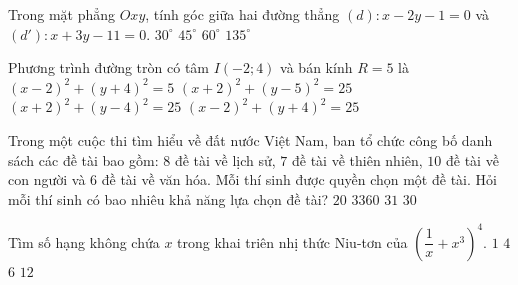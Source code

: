 \begin{ex}%
	Trong mặt phẳng $Oxy$, tính góc giữa hai đường thẳng $(d)\colon  x - 2y -1 = 0$ và  $(d')\colon x + 3y -11 = 0$. 
	\choice
	{$30^\circ$}
	{\True $45^\circ$}
	{$60^\circ$}
	{$135^\circ$}
\end{ex}

\begin{ex}%
	Phương trình đường tròn có tâm $I(-2; 4)$ và bán kính $R = 5$ là
	\choice
	{$(x-2)^2+(y+4)^2=5$}
	{$(x+2)^2+(y-5)^2=25$}
	{\True $(x+2)^2+(y-4)^2=25$}
	{$(x-2)^2+(y+4)^2=25$}
\end{ex}

\begin{ex}%
	Trong một cuộc thi tìm hiểu về đất nước Việt Nam, ban tổ chức công bố danh sách các đề tài bao gồm: $8$ đề tài về lịch sử, $7$ đề tài về thiên nhiên, $10$ đề tài về con người và $6$ đề tài về văn hóa. Mỗi thí sinh được quyền chọn một đề tài. Hỏi mỗi thí sinh có bao nhiêu khả năng lựa chọn đề tài?
	\choice
	{$20$}
	{\True $3360$}
	{$31$}
	{$30$}
\end{ex}

\begin{ex}%
	Tìm số hạng không chứa $x$ trong khai triên nhị thức Niu-tơn của $\left(\dfrac{1}{x}+x^3\right)^4$.
	\choice
	{$1$}
	{\True $4$}
	{$6$}
	{$12$}
\end{ex}

